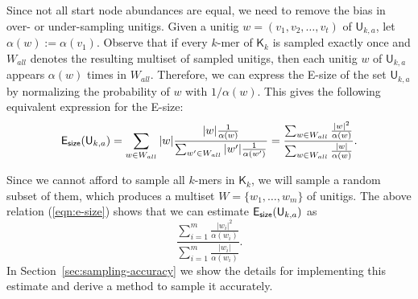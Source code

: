 \documentclass[a4paper,11pt]{article}
\newcommand{\U}{\mathsf{U}_{k,a}}
\newcommand{\K}{\mathsf{K}}
\newcommand{\abu}{\alpha}
\newcommand{\esize}{{\sf E_{size}}}
\begin{document}
Since not all start node abundances are equal, we need to remove the bias in over- or under-sampling unitigs. Given a unitig $w = (v_1,v_2,\dots,v_t)$ of $\U$, let $\abu(w) := \abu(v_1)$. Observe that if every $k$-mer of $\K_k$ is sampled exactly once and $W_{all}$ denotes the resulting multiset of sampled unitigs, then each unitig $w$ of $\U$ appears $\abu(w)$ times in $W_{all}$. Therefore, we can express the E-size of the set $\U$ by normalizing the probability of $w$ with $1/\abu(w)$. This gives the following equivalent expression for the E-size:
\begin{equation}
\esize(\U) = \sum_{w \in W_{all}} |w| \frac{|w|\frac{1}{\alpha(w)}}{\sum_{w' \in W_{all}}|w'|\frac{1}{\alpha(w')}} = \frac{\sum_{w \in W_{all}}\frac{|w|^2}{\alpha(w)}}{\sum_{w \in W_{all}}\frac{|w|}{\alpha(w)}}.
\label{eqn:e-size}
\end{equation}

Since we cannot afford to sample all $k$-mers in $\K_k$, we will sample a random subset of them, which produces a multiset $W = \{w_1,\dots,w_m\}$ of unitigs. The above relation (\ref{eqn:e-size}) shows that we can estimate $\esize(\U)$ as 
\begin{equation}
\frac{\sum_{i = 1}^{m}\frac{|w_i|^2}{\alpha(w_i)}}{\sum_{i=1}^{m}\frac{|w_i|}{\alpha(w_i)}}.
\label{eqn-esize-estimate}
\end{equation}
In Section~\ref{sec:sampling-accuracy} we show the details for implementing this estimate and derive a method to sample it accurately.
\end{document}
